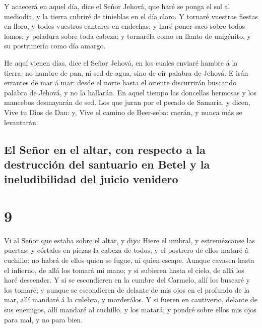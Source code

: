  Y acaecerá en aquel día, dice el Señor Jehová, que haré
se ponga el sol al mediodía, y la tierra cubriré de tinieblas en el día
claro.  Y tornaré vuestras fiestas en lloro, y todos
vuestros cantares en endechas; y haré poner saco sobre todos lomos, y
peladura sobre toda cabeza; y tornaréla como en llanto de unigénito, y
su postrimería como día amargo.

 He aquí vienen días, dice el Señor Jehová, en los cuales
enviaré hambre á la tierra, no hambre de pan, ni sed de agua, sino de
oir palabra de Jehová.  E irán errantes de mar á mar:
desde el norte hasta el oriente discurrirán buscando palabra de Jehová,
y no la hallarán.  En aquel tiempo las doncellas hermosas
y los mancebos desmayarán de sed.  Los que juran por el
pecado de Samaria, y dicen, Vive tu Dios de Dan: y, Vive el camino de
Beer-seba: caerán, y nunca más se levantarán.

\hypertarget{el-seuxf1or-en-el-altar-con-respecto-a-la-destrucciuxf3n-del-santuario-en-betel-y-la-ineludibilidad-del-juicio-venidero}{%
\subsection{El Señor en el altar, con respecto a la destrucción del
santuario en Betel y la ineludibilidad del juicio
venidero}\label{el-seuxf1or-en-el-altar-con-respecto-a-la-destrucciuxf3n-del-santuario-en-betel-y-la-ineludibilidad-del-juicio-venidero}}

\hypertarget{section-8}{%
\section{9}\label{section-8}}

 Vi al Señor que estaba sobre el altar, y dijo: Hiere el
umbral, y estremézcanse las puertas: y córtales en piezas la cabeza de
todos; y el postrero de ellos mataré á cuchillo: no habrá de ellos quien
se fugue, ni quien escape.  Aunque cavasen hasta el
infierno, de allá los tomará mi mano; y si subieren hasta el cielo, de
allá los haré descender.  Y si se escondieren en la cumbre
del Carmelo, allí los buscaré y los tomaré; y aunque se escondieren de
delante de mis ojos en el profundo de la mar, allí mandaré á la culebra,
y morderálos.  Y si fueren en cautiverio, delante de sus
enemigos, allí mandaré al cuchillo, y los matará; y pondré sobre ellos
mis ojos para mal, y no para bien.

